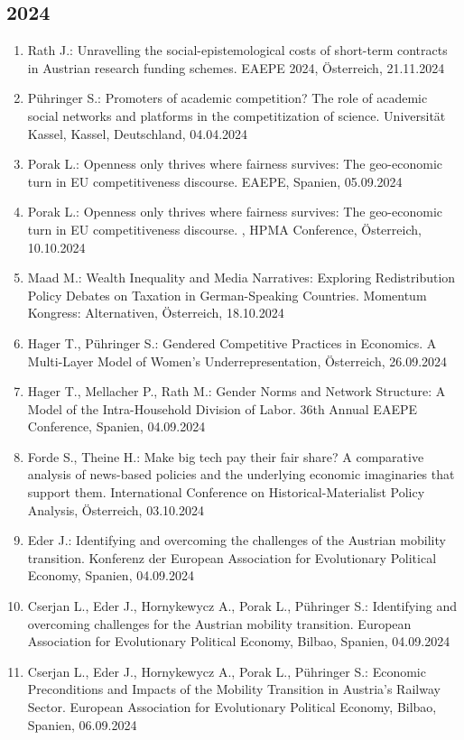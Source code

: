 \subsection*{2024}

\begin{enumerate}
	\item Rath J.: Unravelling the social-epistemological costs of short-term contracts in Austrian research funding schemes. EAEPE 2024, Österreich, 21.11.2024
	\item Pühringer S.: Promoters of academic competition? The role of academic social networks and platforms in the competitization of science. Universität Kassel, Kassel, Deutschland, 04.04.2024
	\item Porak L.: Openness only thrives where fairness survives: The geo-economic turn in EU competitiveness discourse. EAEPE, Spanien, 05.09.2024
	\item Porak L.: Openness only thrives where fairness survives: The geo-economic turn in EU competitiveness discourse. , HPMA Conference, Österreich, 10.10.2024
	\item Maad M.: Wealth Inequality and Media Narratives: Exploring Redistribution Policy Debates on Taxation in German-Speaking Countries. Momentum Kongress: Alternativen, Österreich, 18.10.2024
	\item Hager T., Pühringer S.: Gendered Competitive Practices in Economics. A Multi-Layer Model of Women’s Underrepresentation, Österreich, 26.09.2024
	\item Hager T., Mellacher P., Rath M.: Gender Norms and Network Structure: A Model of the Intra-Household Division of Labor. 36th Annual EAEPE Conference, Spanien, 04.09.2024
	\item Forde S., Theine H.: Make big tech pay their fair share? A comparative analysis of news-based policies and the underlying economic imaginaries that support them. International Conference on Historical-Materialist Policy Analysis, Österreich, 03.10.2024
	\item Eder J.: Identifying and overcoming the challenges of the Austrian mobility transition. Konferenz der European Association for Evolutionary Political Economy, Spanien, 04.09.2024
	\item Cserjan L., Eder J., Hornykewycz A., Porak L., Pühringer S.: Identifying and overcoming challenges for the Austrian mobility transition. European Association for Evolutionary Political Economy, Bilbao, Spanien, 04.09.2024
	\item Cserjan L., Eder J., Hornykewycz A., Porak L., Pühringer S.: Economic Preconditions and Impacts of the Mobility Transition in Austria's Railway Sector. European Association for Evolutionary Political Economy, Bilbao, Spanien, 06.09.2024

\end{enumerate}
